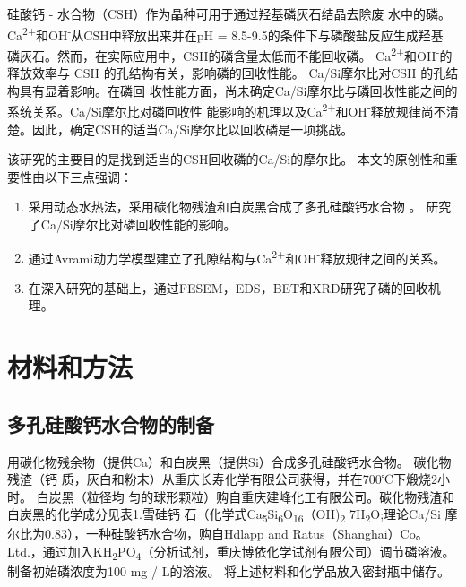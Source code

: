 \documentclass[11pt]{article}
\begin{document}
硅酸钙 - 水合物（CSH）作为晶种可用于通过羟基磷灰石结晶去除废
水中的磷。\cite{battistoni01_phosp_remov_from_real_anaer} Ca\textsuperscript{2+}和OH\textsuperscript{-}从CSH中释放出来并在pH = 8.5-9.5的条件下与磷酸盐反应生成羟基
磷灰石。然而，在实际应用中，CSH的磷含量太低而不能回收磷。
\cite{renman10_long_term_phosp_remov_by,de-bashan04_recen_advan_remov_phosp_from}  Ca\textsuperscript{2+}和OH\textsuperscript{-}的释放效率与
CSH \cite{yin11_phosp_remov_from_wastew_by} 的孔结构有关，影响磷的回收性能。
\cite{westholm06_subst_phosp_remov_poten_benef,baur04_dissol_precip_behav_ettrin_monos}
Ca/Si摩尔比对CSH
\cite{chen04_solub_struc_calcium_silic_hydrat,soyer-uzun11_compos_evolut_calcium_silic_hydrat,richardson04_tober_tober_hydrox_based_model}
的孔结构具有显着影响。在磷回
收性能方面，尚未确定Ca/Si摩尔比与磷回收性能之间的系统关系。Ca/Si摩尔比对磷回收性
能影响的机理以及Ca\textsuperscript{2+}和OH\textsuperscript{-}释放规律尚不清楚。因此，确定CSH的适当Ca/Si摩尔比以回收磷是一项挑战。

该研究的主要目的是找到适当的CSH回收磷的Ca/Si的摩尔比。 本文的原创性和重要性由以下三点强调：
\begin{enumerate}
\item 采用动态水热法，采用碳化物残渣和白炭黑合成了多孔硅酸钙水合物
\cite{li04_format_micro_porous_spher_partic,mansur10_prepar_charac_cytoc_bioac_coatin} 。 研究了Ca/Si摩尔比对磷回收性能的影响。
\item 通过Avrami动力学模型建立了孔隙结构与Ca\textsuperscript{2+}和OH\textsuperscript{-}释放规律之间的关系。
\item 在深入研究的基础上，通过FESEM，EDS，BET和XRD研究了磷的回收机理。
\end{enumerate}

\section{材料和方法}
\label{sec:orga9c576e}
\subsection{多孔硅酸钙水合物的制备}
\label{sec:org6aa854c}
用碳化物残余物（提供Ca）和白炭黑（提供Si）合成多孔硅酸钙水合物。 碳化物残渣（钙
质，灰白和粉末）从重庆长寿化学有限公司获得，并在700℃下煅烧2小时。 白炭黑（粒径均
匀的球形颗粒）购自重庆建峰化工有限公司。碳化物残渣和白炭黑的化学成分见表1.雪硅钙
石（化学式Ca\textsubscript{5}Si\textsubscript{6}O\textsubscript{16}（OH)\textsubscript{2} \dot 7H\textsubscript{2}O;理论Ca/Si 摩尔比为0.83），一种硅酸钙水合物，购自Hdlapp and Ratus（Shanghai）Co。Ltd.，通过加入KH\textsubscript{2}PO\textsubscript{4}（分析试剂，重庆博依化学试剂有限公司）调节磷溶液。 制备初始磷浓度为100 mg / L的溶液。 将上述材料和化学品放入密封瓶中储存。
\end{document}
